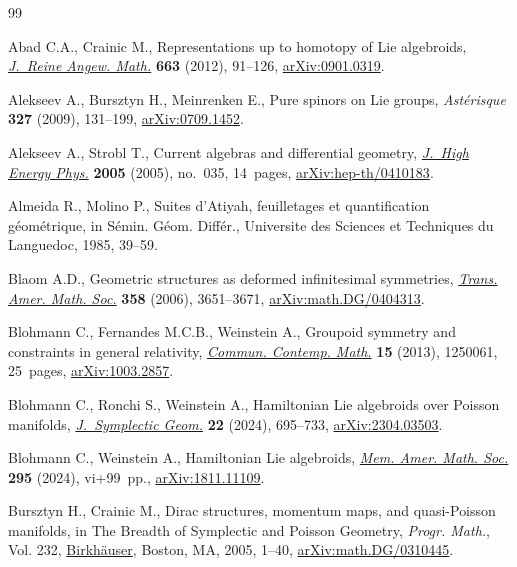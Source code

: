 \documentclass[10pt,a4paper]{amsart}
\numberwithin{equation}{section}
\begin{document}
\begin{thebibliography}{99}
\footnotesize\itemsep=0pt

Abad C.A., Crainic M., Representations up to homotopy of {L}ie algebroids,
 \href{https://doi.org/10.1515/CRELLE.2011.095}{\textit{J.~Reine Angew. Math.}} \textbf{663} (2012), 91--126,
 \href{https://arxiv.org/abs/0901.0319}{arXiv:0901.0319}.

Alekseev A., Bursztyn H., Meinrenken E., Pure spinors on {L}ie groups,
 \textit{Ast\'erisque} \textbf{327} (2009), 131--199, \href{https://arxiv.org/abs/0709.1452}{arXiv:0709.1452}.

Alekseev A., Strobl T., Current algebras and differential geometry,
 \href{https://doi.org/10.1088/1126-6708/2005/03/035}{\textit{J.~High Energy Phys.}} \textbf{2005} (2005), no.~035, 14~pages,
 \href{https://arxiv.org/abs/hep-th/0410183}{arXiv:hep-th/0410183}.

Almeida R., Molino P., Suites d'Atiyah, feuilletages et quantification
 g\'eom\'etrique, in S\'{e}min. G\'{e}om. Diff\'{e}r., Universite des Sciences
 et Techniques du Languedoc, 1985, 39--59.

Blaom A.D., Geometric structures as deformed infinitesimal symmetries,
 \href{https://doi.org/10.1090/S0002-9947-06-04057-8}{\textit{Trans. Amer. Math. Soc.}} \textbf{358} (2006), 3651--3671,
 \href{https://arxiv.org/abs/math.DG/0404313}{arXiv:math.DG/0404313}.

Blohmann C., Fernandes M.C.B., Weinstein A., Groupoid symmetry and constraints
 in general relativity, \href{https://doi.org/10.1142/S0219199712500617}{\textit{Commun. Contemp. Math.}} \textbf{15} (2013),
 1250061, 25~pages, \href{https://arxiv.org/abs/1003.2857}{arXiv:1003.2857}.

Blohmann C., Ronchi S., Weinstein A., Hamiltonian {L}ie algebroids over
 {P}oisson manifolds, \href{https://doi.org/10.4310/jsg.241021220342}{\textit{J.~Symplectic Geom.}} \textbf{22} (2024),
 695--733, \href{https://arxiv.org/abs/2304.03503}{arXiv:2304.03503}.

Blohmann C., Weinstein A., Hamiltonian {L}ie algebroids, \href{https://doi.org/10.1090/memo/1474}{\textit{Mem. Amer.
 Math. Soc.}} \textbf{295} (2024), vi+99~pp., \href{https://arxiv.org/abs/1811.11109}{arXiv:1811.11109}.

Bursztyn H., Crainic M., Dirac structures, momentum maps, and quasi-{P}oisson
 manifolds, in The {B}readth of {S}ymplectic and {P}oisson {G}eometry,
 \textit{Progr. Math.}, Vol. 232, \href{https://doi.org/10.1007/0-8176-4419-9_1}{Birkh\"auser}, Boston, MA, 2005, 1--40,
 \href{https://arxiv.org/abs/math.DG/0310445}{arXiv:math.DG/0310445}.


\end{thebibliography}
\end{document}
